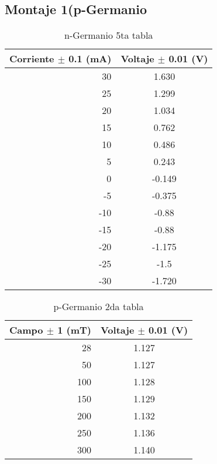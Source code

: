 \documentclass[aps,prl,reprint]{revtex4-1}
\begin{document}
\subsection{\label{sec:level2}Montaje 1(p-Germanio}

\begin{table}[H]
\begin{center}
\begin{tabular}
{|| r || c ||} 
\hline\hline
Corriente $\pm$ 0.1 (mA)& Voltaje $\pm$ 0.01 (V)  \\

\hline

30 & 1.630 \\
25 & 1.299 \\
20 & 1.034 \\
15 & 0.762 \\
10 & 0.486 \\
5 & 0.243 \\
0 & -0.149\\
-5 & -0.375 \\
-10 & -0.88 \\
-15 & -0.88 \\
-20 & -1.175 \\
-25 & -1.5 \\
-30 & -1.720\\

\hline\hline
\end{tabular}
\end{center}
\caption{n-Germanio 5ta tabla}
\label{1p}
\end{table}


\begin{table}[H]
\begin{center}
\begin{tabular}
{|| r || c ||} 
\hline\hline
Campo $\pm$ 1 (mT) & Voltaje $\pm$ 0.01 (V) \\ 
\hline

28 & 1.127\\
50&1.127\\
100 & 1.128\\
150 & 1.129 \\
200 & 1.132\\
250 & 1.136\\
300 & 1.140 \\

\hline\hline
\end{tabular}
\end{center}
\caption{p-Germanio 2da tabla}
\label{2p}
\end{table}
\end{document}
